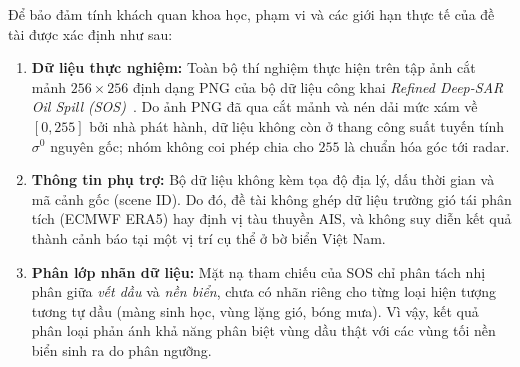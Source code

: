 Để bảo đảm tính khách quan khoa học, phạm vi và các giới hạn thực tế của đề tài được xác định như sau:
\begin{enumerate}
    \item \textbf{Dữ liệu thực nghiệm:} Toàn bộ thí nghiệm thực hiện trên tập ảnh cắt mảnh $256 \times 256$ định dạng PNG của bộ dữ liệu công khai \textit{Refined Deep-SAR Oil Spill (SOS)}~\cite{zuenko2025refined}. Do ảnh PNG đã qua cắt mảnh và nén dải mức xám về $[0, 255]$ bởi nhà phát hành, dữ liệu không còn ở thang công suất tuyến tính $\sigma^0$ nguyên gốc; nhóm không coi phép chia cho $255$ là chuẩn hóa góc tới radar.
    \item \textbf{Thông tin phụ trợ:} Bộ dữ liệu không kèm tọa độ địa lý, dấu thời gian và mã cảnh gốc (scene ID). Do đó, đề tài không ghép dữ liệu trường gió tái phân tích (ECMWF ERA5) hay định vị tàu thuyền AIS, và không suy diễn kết quả thành cảnh báo tại một vị trí cụ thể ở bờ biển Việt Nam.
    \item \textbf{Phân lớp nhãn dữ liệu:} Mặt nạ tham chiếu của SOS chỉ phân tách nhị phân giữa \textit{vết dầu} và \textit{nền biển}, chưa có nhãn riêng cho từng loại hiện tượng tương tự dầu (màng sinh học, vùng lặng gió, bóng mưa). Vì vậy, kết quả phân loại phản ánh khả năng phân biệt vùng dầu thật với các vùng tối nền biển sinh ra do phân ngưỡng.
\end{enumerate}
